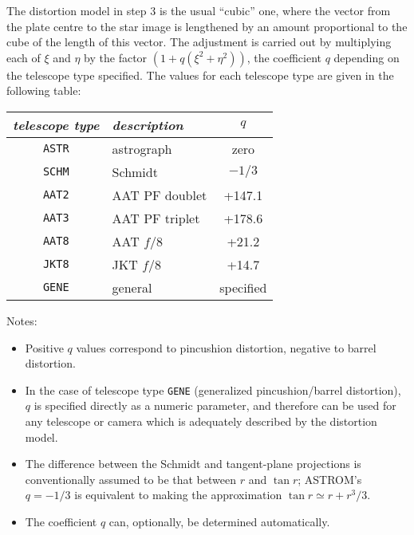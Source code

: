 \documentclass[twoside,11pt]{article}
\renewcommand{\_}{\texttt{\symbol{95}}}
\begin{document}
The distortion model in step 3 is the usual ``cubic'' one, where the
vector from the plate centre to the star image is lengthened by an amount
proportional to the cube of the length of this vector.  The adjustment is
carried out by multiplying each of $\xi$ and $\eta$ by the factor $(1 +
q (\xi^{2}+\eta^{2}))$, the coefficient $q$ depending on the telescope
type specified.  The values for each telescope type are given in the
following table:

\goodbreak
\begin{center}
\begin{tabular}{|c|l|c|}
\hline
\textit{telescope type} & \textit{description} & $q$ \\
\hline
\texttt{ASTR} & astrograph & zero \\
\texttt{SCHM} & Schmidt & $-1/3$ \\
\texttt{AAT2} & AAT PF doublet & +147.1 \\
\texttt{AAT3} & AAT PF triplet & +178.6 \\
\texttt{AAT8} & AAT $f/8$ & +21.2 \\
\texttt{JKT8} & JKT $f/8$ & +14.7 \\
\texttt{GENE} & general & specified \\
\hline
\end{tabular}
\end{center}

\goodbreak
Notes:
\begin{itemize}

\item Positive $q$ values correspond to pincushion distortion,
   negative to barrel distortion.

\item In the case of telescope type \texttt{GENE}
   (generalized pincushion/barrel distortion), $q$ is specified directly
   as a numeric parameter, and therefore can be used for any telescope
   or camera which is adequately described by the distortion model.

\item The difference between the Schmidt and tangent-plane
   projections is conventionally assumed to be that between $r$ and $\tan
   r$; ASTROM's $q = -1/3$ is equivalent to making the approximation
   $\tan r \simeq r + r^3/3$.

\item The coefficient $q$ can, optionally, be determined automatically.

\end{itemize}
\end{document}
